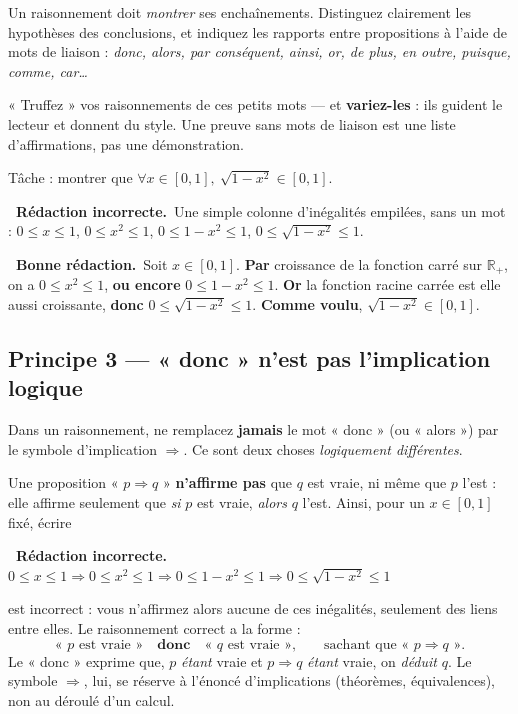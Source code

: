 \documentclass[11pt,a4paper]{article}
\newcommand{\ok}{\textcolor{METeal}{\textbf{\ding{51}\ \sffamily Bonne rédaction.}}\ }
\newcommand{\ko}{\textcolor{MECoral}{\textbf{\ding{55}\ \sffamily Rédaction incorrecte.}}\ }
\newcommand{\R}{\mathbb{R}}
\begin{document}
Un raisonnement doit \emph{montrer} ses enchaînements. Distinguez clairement les hypothèses
des conclusions, et indiquez les rapports entre propositions à l'aide de mots de liaison :
\emph{donc, alors, par conséquent, ainsi, or, de plus, en outre, puisque, comme, car\dots}

\begin{astuce}
« Truffez » vos raisonnements de ces petits mots — et \textbf{variez-les} : ils guident le
lecteur et donnent du style. Une preuve sans mots de liaison est une liste d'affirmations,
pas une démonstration.
\end{astuce}

Tâche : montrer que $\forall x\in[0,1],\ \sqrt{1-x^2}\in[0,1]$.
\begin{mauvaise}
\ko Une simple colonne d'inégalités empilées, sans un mot :
$0\le x\le 1$, $0\le x^2\le 1$, $0\le 1-x^2\le 1$, $0\le\sqrt{1-x^2}\le 1$.
\end{mauvaise}
\begin{bonne}
\ok Soit $x\in[0,1]$. \textbf{Par} croissance de la fonction carré sur $\R_+$, on a
$0\le x^2\le 1$, \textbf{ou encore} $0\le 1-x^2\le 1$. \textbf{Or} la fonction racine carrée
est elle aussi croissante, \textbf{donc} $0\le\sqrt{1-x^2}\le 1$. \textbf{Comme voulu},
$\sqrt{1-x^2}\in[0,1]$.
\end{bonne}

\subsection{Principe 3 — « donc » n'est pas l'implication logique}

\begin{attention}
Dans un raisonnement, ne remplacez \textbf{jamais} le mot « donc » (ou « alors ») par le
symbole d'implication $\Longrightarrow$. Ce sont deux choses \emph{logiquement différentes}.
\end{attention}

Une proposition « $p\Longrightarrow q$ » \textbf{n'affirme pas} que $q$ est vraie, ni même que
$p$ l'est : elle affirme seulement que \emph{si} $p$ est vraie, \emph{alors} $q$ l'est. Ainsi,
pour un $x\in[0,1]$ fixé, écrire
\begin{mauvaise}
\ko $0\le x\le 1 \Longrightarrow 0\le x^2\le 1 \Longrightarrow 0\le 1-x^2\le 1
\Longrightarrow 0\le\sqrt{1-x^2}\le 1$
\end{mauvaise}
est incorrect : vous n'affirmez alors aucune de ces inégalités, seulement des liens entre
elles. Le raisonnement correct a la forme :
\[
\text{« $p$ est vraie »}\quad\textbf{donc}\quad\text{« $q$ est vraie »,}
\qquad\text{sachant que « $p\Longrightarrow q$ ».}
\]
Le « donc » exprime que, $p$ \emph{étant} vraie et $p\Rightarrow q$ \emph{étant} vraie, on
\emph{déduit} $q$. Le symbole $\Longrightarrow$, lui, se réserve à l'énoncé d'implications
(théorèmes, équivalences), non au déroulé d'un calcul.
\end{document}
